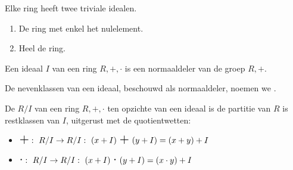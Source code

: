 \documentclass[main.tex]{subfiles}
\begin{document}
\begin{st}
  Elke ring heeft twee triviale idealen.
  \begin{enumerate}
  \item De ring met enkel het nulelement.
  \item Heel de ring.
  \end{enumerate}
\end{st}

\begin{ei}
  Een ideaal $I$ van een ring $R,+,\cdot$ is een normaaldeler van de groep $R,+$.
\end{ei}

\begin{de}
  De nevenklassen van een ideaal, beschouwd als normaaldeler, noemen we .
\end{de}

\begin{de}
  De  $R/I$ van een ring $R,+,\cdot$ ten opzichte van een ideaal is de partitie van $R$ is restklassen van $I$, uitgerust met de quotientwetten:
  \begin{itemize}
  \item $\scalebox{1.5}{$+$}:\ R/I \rightarrow R/I:\ (x+I)\ \scalebox{1.5}{$+$}\ (y+I) = (x+y)+I$
  \item $\scalebox{1.5}{$\cdot$}:\ R/I \rightarrow R/I:\ (x+I)\ \scalebox{1.5}{$\cdot$}\ (y+I) = (x\cdot y) + I$
  \end{itemize}
\end{de}




\end{document}
